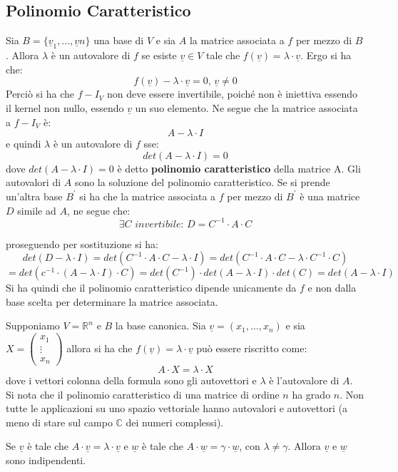 \documentclass[a4paper,12pt, oneside]{book}
\begin{document}
\subsection{Polinomio Caratteristico}
\begin{definizione}
	Sia $B=\{\underline{v}_1,...,\underline{v}n\}$ una base di $V$ e sia $A$ la matrice associata a $f$ per mezzo di $B$. Allora $\lambda$ è un autovalore di $f$ se esiste $\underline{v}\in V$ tale che $f(\underline{v})=\lambda\cdot \underline{v}$. Ergo si ha che:
	$$f(\underline{v})-\lambda\cdot \underline{v}=0,\, \underline{v}\neq 0$$ Perciò si ha che $f-I_V$ non deve essere invertibile, poiché non è iniettiva essendo il kernel non nullo, essendo $\underline{v}$ un suo elemento. Ne segue che la matrice associata a $f-I_V$ è:
	$$A-\lambda\cdot I$$
	e quindi $\lambda$ è un autovalore di $f$ sse:
	$$det(A-\lambda\cdot I)=0$$
	dove $det(A-\lambda\cdot I)=0$ è detto \textbf{polinomio caratteristico} della matrice A. Gli autovalori di $A$ sono la soluzione del polinomio caratteristico. Se si prende un'altra base $B^{'}$ si ha che la matrice associata a $f$ per mezzo di $B^{'}$ è una matrice $D$ simile ad $A$, ne segue che:
	$$\exists C \,\, invertibile :\, D=C^{-1}\cdot A\cdot C$$

	proseguendo per sostituzione si ha:
	$$det(D-\lambda\cdot I)=det(C^{-1}\cdot A\cdot C-\lambda\cdot I)=det(C^{-1}\cdot A\cdot C-\lambda\cdot C^{-1}\cdot C)$$
	$$=det(c^{-1}\cdot (A-\lambda\cdot I)\cdot C)=det(C^{-1})\cdot det(A-\lambda\cdot I)\cdot det(C)=det(A-\lambda\cdot I)$$
	Si ha quindi che il polinomio caratteristico dipende unicamente da $f$ e non dalla base scelta per determinare la matrice associata.
\end{definizione}
Supponiamo $V=\mathbb{R}^n$ e $B$ la base canonica. Sia $\underline{v}=(x_1,...,x_n)$ e sia $
	X=\left(\begin{matrix}
			x_1    \\
			\vdots \\
			x_n
		\end{matrix}\right)
$ allora si ha che $f(\underline{v})=\lambda\cdot \underline{v}$ può essere riscritto come:
$$A\cdot X=\lambda\cdot X$$
dove i vettori colonna della formula sono gli autovettori e $\lambda$ è l'autovalore di $A$.\\
Si nota che il polinomio caratteristico di una matrice di ordine $n$ ha grado $n$. Non tutte le applicazioni su uno spazio vettoriale hanno autovalori e autovettori (a meno di stare sul campo $\mathbb{C}$ dei numeri complessi).
\begin{teorema}
	Se $\underline{v}$ è tale che $A\cdot \underline{v}=\lambda\cdot \underline{v}$ e $\underline{w}$ è tale che $A\cdot\underline{w}=\gamma\cdot\underline{w}$, con $\lambda\neq \gamma$. Allora $\underline{v}$ e $\underline{w}$ sono indipendenti.
\end{teorema}
\end{document}
